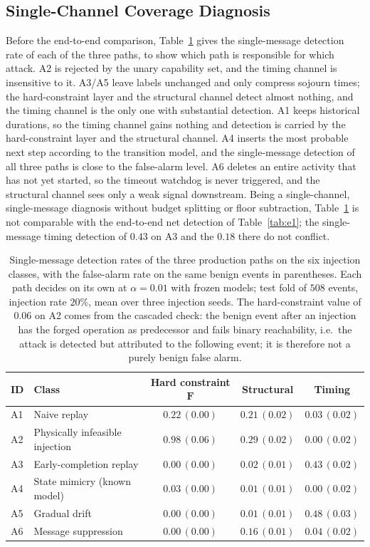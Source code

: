 \documentclass[manuscript,screen,review]{acmart}
\begin{document}
\subsection{Single-Channel Coverage Diagnosis}
\label{sec:diag}

Before the end-to-end comparison, Table~\ref{tab:coverage} gives the single-message detection rate of each of the three paths, to show which path is responsible for which attack. {A2} is rejected by the unary capability set, and the timing channel is insensitive to it. {A3}/{A5} leave labels unchanged and only compress sojourn times; the hard-constraint layer and the structural channel detect almost nothing, and the timing channel is the only one with substantial detection. {A1} keeps historical durations, so the timing channel gains nothing and detection is carried by the hard-constraint layer and the structural channel. {A4} inserts the most probable next step according to the transition model, and the single-message detection of all three paths is close to the false-alarm level. {A6} deletes an entire activity that has not yet started, so the timeout watchdog is never triggered, and the structural channel sees only a weak signal downstream. Being a single-channel, single-message diagnosis without budget splitting or floor subtraction, Table~\ref{tab:coverage} is not comparable with the end-to-end net detection of Table~\ref{tab:e1}; the single-message timing detection of $0.43$ on {A3} and the $0.18$ there do not conflict.

\begin{table}[!t]
\renewcommand{\arraystretch}{1.15}
\caption{Single-message detection rates of the three production paths on the six injection classes, with the false-alarm rate on the same benign events in parentheses. Each path decides on its own at $\alpha=0.01$ with frozen models; test fold of $508$ events, injection rate $20\%$, mean over three injection seeds. The hard-constraint value of $0.06$ on {A2} comes from the cascaded check: the benign event after an injection has the forged operation as predecessor and fails binary reachability, i.e.\ the attack is detected but attributed to the following event; it is therefore not a purely benign false alarm.}
\label{tab:coverage}
\centering
\small
\begin{tabular}{llccc}
\toprule
ID & Class & Hard constraint $\mathbf F$ & Structural & Timing \\
\midrule
{A1} & Naive replay & $0.22\,(0.00)$ & $0.21\,(0.02)$ & $0.03\,(0.02)$ \\
{A2} & Physically infeasible injection & $0.98\,(0.06)$ & $0.29\,(0.02)$ & $0.00\,(0.02)$ \\
{A3} & Early-completion replay & $0.00\,(0.00)$ & $0.02\,(0.01)$ & $0.43\,(0.02)$ \\
{A4} & State mimicry (known model) & $0.03\,(0.00)$ & $0.01\,(0.01)$ & $0.00\,(0.02)$ \\
{A5} & Gradual drift & $0.00\,(0.00)$ & $0.01\,(0.01)$ & $0.48\,(0.03)$ \\
{A6} & Message suppression & $0.00\,(0.00)$ & $0.16\,(0.01)$ & $0.04\,(0.02)$ \\
\bottomrule
\end{tabular}
\end{table}
\end{document}

